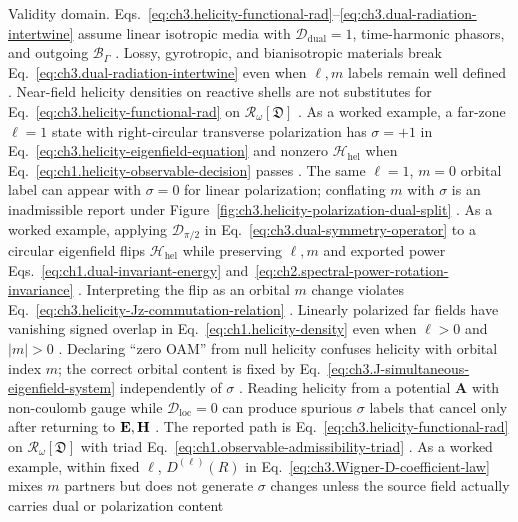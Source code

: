 Validity domain. Eqs.~\eqref{eq:ch3.helicity-functional-rad}--\eqref{eq:ch3.dual-radiation-intertwine} assume linear isotropic
media with \(\mathcal{D}_{\mathrm{dual}}=1\), time-harmonic phasors, and outgoing \(\mathcal{B}_\Gamma\)
\cite{stratton1941}. Lossy, gyrotropic, and bianisotropic materials break
Eq.~\eqref{eq:ch3.dual-radiation-intertwine} even when \(\ell,m\) labels remain well defined
\cite{stratton1941}. Near-field helicity densities on reactive shells are not substitutes for
Eq.~\eqref{eq:ch3.helicity-functional-rad} on \(\mathcal{R}_\omega[\mathfrak{D}]\) \cite{harrington2001}.
As a worked example, a far-zone \(\ell=1\) state with right-circular transverse polarization has \(\sigma=+1\) in
Eq.~\eqref{eq:ch3.helicity-eigenfield-equation} and nonzero \(\mathcal{H}_{\mathrm{hel}}\) when
Eq.~\eqref{eq:ch1.helicity-observable-decision} passes \cite{jackson1999}. The same \(\ell=1\),
\(m=0\) orbital label can appear with \(\sigma=0\) for linear polarization; conflating \(m\) with \(\sigma\) is
an inadmissible report under Figure~\ref{fig:ch3.helicity-polarization-dual-split} \cite{belinfante1940}.
As a worked example, applying \(\mathcal{D}_{\pi/2}\) in Eq.~\eqref{eq:ch3.dual-symmetry-operator} to a circular eigenfield flips
\(\mathcal{H}_{\mathrm{hel}}\) while preserving \(\ell,m\) and exported power
Eqs.~\eqref{eq:ch1.dual-invariant-energy} and~\eqref{eq:ch2.spectral-power-rotation-invariance}
\cite{stratton1941}. Interpreting the flip as an orbital \(m\) change violates
Eq.~\eqref{eq:ch3.helicity-Jz-commutation-relation} \cite{jackson1999}.
Linearly polarized far fields have vanishing signed overlap in Eq.~\eqref{eq:ch1.helicity-density} even when
\(\ell>0\) and \(|m|>0\) \cite{stratton1941}. Declaring ``zero OAM'' from null helicity confuses
helicity with orbital index \(m\); the correct orbital content is fixed by
Eq.~\eqref{eq:ch3.J-simultaneous-eigenfield-system} independently of \(\sigma\)
\cite{belinfante1940}.
Reading helicity from a potential \(\mathbf{A}\) with non-coulomb gauge while \(\mathcal{D}_{\mathrm{loc}}=0\)
can produce spurious \(\sigma\) labels that cancel only after returning to \(\mathbf{E},\mathbf{H}\)
\cite{stratton1941}. The reported path is
Eq.~\eqref{eq:ch3.helicity-functional-rad} on \(\mathcal{R}_\omega[\mathfrak{D}]\) with triad
Eq.~\eqref{eq:ch1.observable-admissibility-triad} \cite{harrington2001}.
As a worked example, within fixed \(\ell\), \(D^{(\ell)}(R)\) in Eq.~\eqref{eq:ch3.Wigner-D-coefficient-law} mixes \(m\) partners but
does not generate \(\sigma\) changes unless the source field actually carries dual or polarization content

